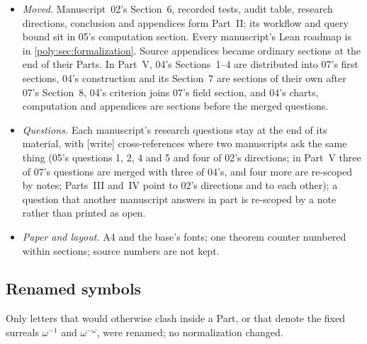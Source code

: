 \documentclass[11pt,a4paper]{article}
\numberwithin{equation}{section}
\theoremstyle{plain}
\newcommand{\wtag}{\textup{[write]}}%
\newcommand{\st}{\operatorname{st}}
\newcommand{\conv}{\operatorname{conv}}
\begin{document}
\begin{itemize}
Yannakakis's factorization beside 07's displayed factorization, and the two
different reflection lemmas; 04's $\st\conv=\conv\st$ is printed in its
conventions with a pointer to \cref{poly:prop:stconv}.
\item \emph{Moved.} Manuscript~02's Section~6, recorded tests, audit table,
research directions, conclusion and appendices form Part~II; its workflow
and query bound sit in 05's computation section. Every manuscript's Lean
roadmap is in \cref{poly:sec:formalization}. Source appendices became
ordinary sections at the end of their Parts. In Part~V, 04's Sections~1--4 are distributed into 07's
first sections, 04's construction and its Section~7 are sections of their
own after 07's Section~8, 04's criterion joins 07's field section, and 04's
charts, computation and appendices are sections before the merged
questions.
\item \emph{Questions.} Each manuscript's research questions stay at the end
of its material, with \wtag{} cross-references where two manuscripts ask
the same thing (05's questions 1, 2, 4 and 5 and four of 02's directions;
in Part~V three of 07's questions are merged with three of
04's, and four more are re-scoped by notes; Parts~III and~IV point to 02's
directions and to each other); a question that another manuscript answers in part is
re-scoped by a note rather than printed as open.
\item \emph{Paper and layout.} A4 and the base's fonts; one theorem counter
numbered within sections; source numbers are not kept.
\end{itemize}


\subsection{Renamed symbols}

Only letters that would otherwise clash inside a Part, or that denote the
fixed surreals $\omega^{-1}$ and $\omega^{-\omega}$, were renamed; no
normalization changed.
\end{document}
